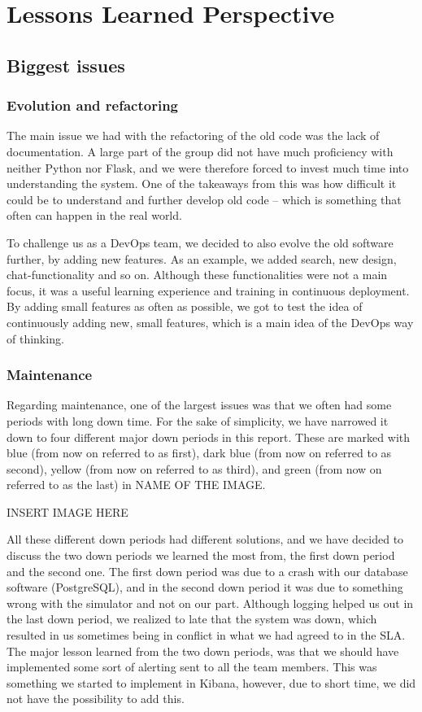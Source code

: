 \section{Lessons Learned Perspective}
\subsection{Biggest issues}
\subsubsection{Evolution and refactoring}
The main issue we had with the refactoring of the old code was the lack of documentation. A large part of the group did not have much proficiency with neither Python nor Flask, and we were therefore forced to invest much time into understanding the system. One of the takeaways from this was how difficult it could be to understand and further develop old code – which is something that often can happen in the real world.

To challenge us as a DevOps team, we decided to also evolve the old software further, by adding new features. As an example, we added search, new design, chat-functionality and so on. Although these functionalities were not a main focus, it was a useful learning experience and training in continuous deployment. By adding small features as often as possible, we got to test the idea of continuously adding new, small features, which is a main idea of the DevOps way of thinking.

\subsubsection{Maintenance}

Regarding maintenance, one of the largest issues was that we often had some periods with long down time. For the sake of simplicity, we have narrowed it down to four different major down periods in this report. These are marked with blue (from now on referred to as first), dark blue (from now on referred to as second), yellow (from now on referred to as third), and green (from now on referred to as the last) in NAME OF THE IMAGE.

INSERT IMAGE HERE
 
All these different down periods had different solutions, and we have decided to discuss the two down periods we learned the most from, the first down period and the second one. The first down period was due to a crash with our database software (PostgreSQL), and in the second down period it was due to something wrong with the simulator and not on our part. Although logging helped us out in the last down period, we realized to late that the system was down, which resulted in us sometimes being in conflict in what we had agreed to in the SLA. The major lesson learned from the two down periods, was that we should have implemented some sort of alerting sent to all the team members. This was something we started to implement in Kibana, however, due to short time, we did not have the possibility to add this.

